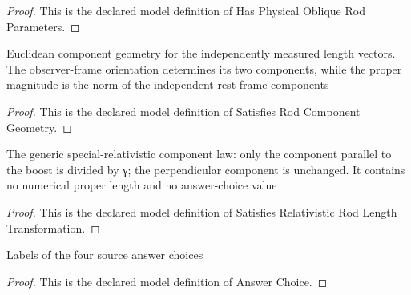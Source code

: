 \begin{proof}
  This is the declared model definition of Has Physical Oblique Rod Parameters.
\end{proof}
\begin{definition}
  \label{def:physics:phyx-mini-0650:phyxminiproblems-problemphyxmini0650-satisfiesrodcomponentgeometry}
  Euclidean component geometry for the independently measured length vectors. The observer-frame orientation determines its two components, while the proper magnitude is the norm of the independent rest-frame components
\end{definition}
\begin{proof}
  This is the declared model definition of Satisfies Rod Component Geometry.
\end{proof}
\begin{definition}
  \label{def:physics:phyx-mini-0650:phyxminiproblems-problemphyxmini0650-satisfiesrelativisticrodlengthtransformation}
  The generic special-relativistic component law: only the component parallel to the boost is divided by γ; the perpendicular component is unchanged. It contains no numerical proper length and no answer-choice value
\end{definition}
\begin{proof}
  This is the declared model definition of Satisfies Relativistic Rod Length Transformation.
\end{proof}
\begin{definition}
  \label{def:physics:phyx-mini-0650:phyxminiproblems-problemphyxmini0650-answerchoice}
  Labels of the four source answer choices
\end{definition}
\begin{proof}
  This is the declared model definition of Answer Choice.
\end{proof}
